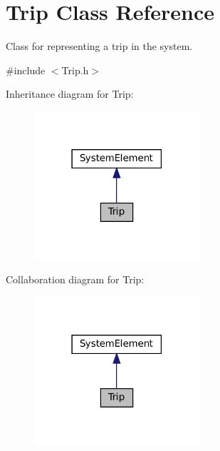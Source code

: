 \hypertarget{classTrip}{}\section{Trip Class Reference}
\label{classTrip}


Class for representing a trip in the system.  




{\ttfamily \#include $<$Trip.\+h$>$}



Inheritance diagram for Trip\+:
\nopagebreak
\begin{figure}[H]
\begin{center}
\leavevmode
\includegraphics[width=174pt]{classTrip__inherit__graph}
\end{center}
\end{figure}


Collaboration diagram for Trip\+:
\nopagebreak
\begin{figure}[H]
\begin{center}
\leavevmode
\includegraphics[width=174pt]{classTrip__coll__graph}
\end{center}
\end{figure}
